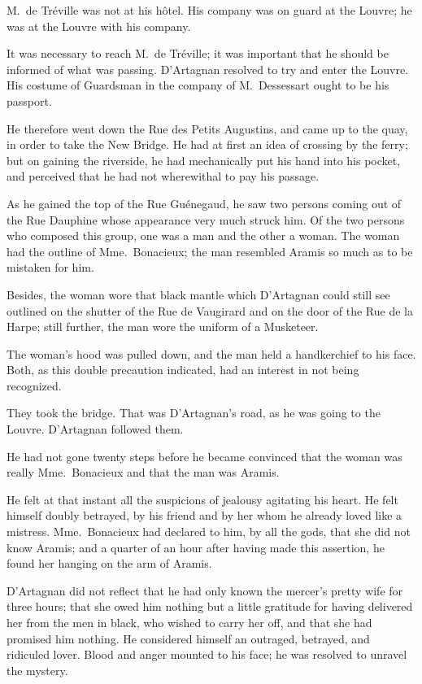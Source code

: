 M.~de Tréville was not at his hôtel. His company was on guard at the Louvre; he was at the Louvre with his company. 

It was necessary to reach M.~de Tréville; it was important that he should be informed of what was passing. D'Artagnan resolved to try and enter the Louvre. His costume of Guardsman in the company of M.~Dessessart ought to be his passport. 

He therefore went down the Rue des Petits Augustins, and came up to the quay, in order to take the New Bridge. He had at first an idea of crossing by the ferry; but on gaining the riverside, he had mechanically put his hand into his pocket, and perceived that he had not wherewithal to pay his passage. 

As he gained the top of the Rue Guénegaud, he saw two persons coming out of the Rue Dauphine whose appearance very much struck him. Of the two persons who composed this group, one was a man and the other a woman. The woman had the outline of Mme.~Bonacieux; the man resembled Aramis so much as to be mistaken for him. 

Besides, the woman wore that black mantle which D'Artagnan could still see outlined on the shutter of the Rue de Vaugirard and on the door of the Rue de la Harpe; still further, the man wore the uniform of a Musketeer. 

The woman's hood was pulled down, and the man held a handkerchief to his face. Both, as this double precaution indicated, had an interest in not being recognized. 

They took the bridge. That was D'Artagnan's road, as he was going to the Louvre. D'Artagnan followed them. 

He had not gone twenty steps before he became convinced that the woman was really Mme.~Bonacieux and that the man was Aramis. 

He felt at that instant all the suspicions of jealousy agitating his heart. He felt himself doubly betrayed, by his friend and by her whom he already loved like a mistress. Mme.~Bonacieux had declared to him, by all the gods, that she did not know Aramis; and a quarter of an hour after having made this assertion, he found her hanging on the arm of Aramis. 

D'Artagnan did not reflect that he had only known the mercer's pretty wife for three hours; that she owed him nothing but a little gratitude for having delivered her from the men in black, who wished to carry her off, and that she had promised him nothing. He considered himself an outraged, betrayed, and ridiculed lover. Blood and anger mounted to his face; he was resolved to unravel the mystery. 

